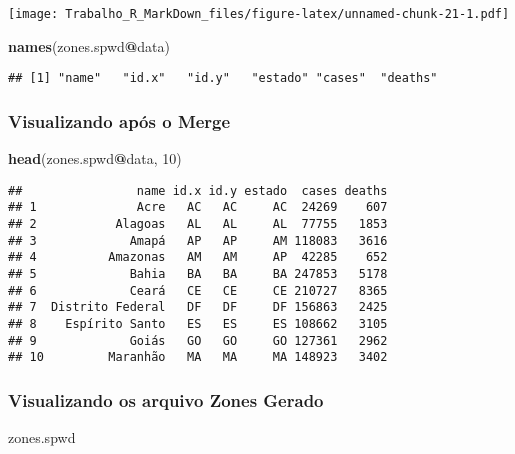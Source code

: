 \documentclass[
]{article}
\newenvironment{Shaded}{\begin{snugshade}}{\end{snugshade}}
\newcommand{\DecValTok}[1]{\textcolor[rgb]{0.00,0.00,0.81}{#1}}
\newcommand{\KeywordTok}[1]{\textcolor[rgb]{0.13,0.29,0.53}{\textbf{#1}}}
\newcommand{\NormalTok}[1]{#1}
\newcommand{\OperatorTok}[1]{\textcolor[rgb]{0.81,0.36,0.00}{\textbf{#1}}}
\begin{document}
\texttt{[image: Trabalho\_R\_MarkDown\_files/figure-latex/unnamed-chunk-21-1.pdf]}

\begin{Shaded}
\begin{Highlighting}[]
\KeywordTok{names}\NormalTok{(zones.spwd}\OperatorTok{@}\NormalTok{data)}
\end{Highlighting}
\end{Shaded}

\begin{verbatim}
## [1] "name"   "id.x"   "id.y"   "estado" "cases"  "deaths"
\end{verbatim}

\hypertarget{visualizando-apuxf3s-o-merge}{%
\subsubsection{Visualizando após o
Merge}\label{visualizando-apuxf3s-o-merge}}

\begin{Shaded}
\begin{Highlighting}[]
\KeywordTok{head}\NormalTok{(zones.spwd}\OperatorTok{@}\NormalTok{data, }\DecValTok{10}\NormalTok{)}
\end{Highlighting}
\end{Shaded}

\begin{verbatim}
##                name id.x id.y estado  cases deaths
## 1              Acre   AC   AC     AC  24269    607
## 2           Alagoas   AL   AL     AL  77755   1853
## 3             Amapá   AP   AP     AM 118083   3616
## 4          Amazonas   AM   AM     AP  42285    652
## 5             Bahia   BA   BA     BA 247853   5178
## 6             Ceará   CE   CE     CE 210727   8365
## 7  Distrito Federal   DF   DF     DF 156863   2425
## 8    Espírito Santo   ES   ES     ES 108662   3105
## 9             Goiás   GO   GO     GO 127361   2962
## 10         Maranhão   MA   MA     MA 148923   3402
\end{verbatim}

\hypertarget{visualizando-os-arquivo-zones-gerado}{%
\subsubsection{Visualizando os arquivo Zones
Gerado}\label{visualizando-os-arquivo-zones-gerado}}

\begin{Shaded}
\begin{Highlighting}[]
\NormalTok{zones.spwd}
\end{Highlighting}
\end{Shaded}
\end{document}

